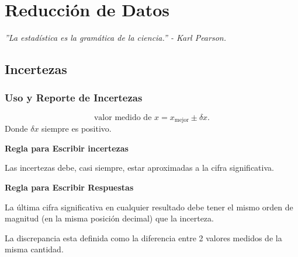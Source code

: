 \part{Reducción de Datos}

\vspace*{\fill}

\begin{center}
	\textit{''La estadística es la gramática de la ciencia.'' - Karl Pearson.}
\end{center}

\vspace*{\fill}



\chapter{Incertezas}
\section{Uso y Reporte de Incertezas}
\begin{equation}
	\boxed{ \text{valor medido de } x = x_{\text{mejor}} \pm \delta x .}
\end{equation}
Donde $\delta x$ siempre es positivo.

\begin{tcolorbox}
	\begin{center}
		\textbf{Regla para Escribir incertezas}
	\end{center}
	Las incertezas debe, casi siempre, estar aproximadas a la cifra significativa.
\end{tcolorbox}


\begin{tcolorbox}
	\begin{center}
		\textbf{Regla para Escribir Respuestas}
	\end{center}
	La última cifra significativa en cualquier resultado debe tener el mismo orden de magnitud (en la misma posición decimal) que la incerteza.
\end{tcolorbox}

\begin{definition}
	La discrepancia esta definida como la diferencia entre 2 valores medidos de la misma cantidad.
\end{definition}

